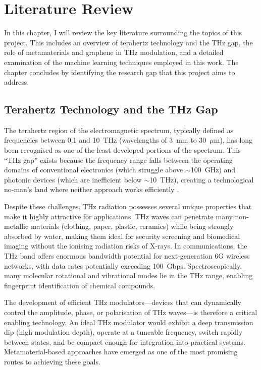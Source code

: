 \documentclass[12pt,a4paper]{report}
\begin{document}
\chapter{Literature Review}
\label{ch:literature}

In this chapter, I will review the key literature surrounding the topics of this project. This includes an overview of terahertz technology and the THz gap, the role of metamaterials and graphene in THz modulation, and a detailed examination of the machine learning techniques employed in this work. The chapter concludes by identifying the research gap that this project aims to address.

\section{Terahertz Technology and the THz Gap}
\label{sec:thz_gap}

The terahertz region of the electromagnetic spectrum, typically defined as frequencies between 0.1 and 10~THz (wavelengths of 3~mm to 30~$\mu$m), has long been recognised as one of the least developed portions of the spectrum. This ``THz gap'' exists because the frequency range falls between the operating domains of conventional electronics (which struggle above $\sim$100~GHz) and photonic devices (which are inefficient below $\sim$10~THz), creating a technological no-man's land where neither approach works efficiently \citep{tonouchi2007}.

Despite these challenges, THz radiation possesses several unique properties that make it highly attractive for applications. THz waves can penetrate many non-metallic materials (clothing, paper, plastic, ceramics) while being strongly absorbed by water, making them ideal for security screening and biomedical imaging without the ionising radiation risks of X-rays. In communications, the THz band offers enormous bandwidth potential for next-generation 6G wireless networks, with data rates potentially exceeding 100~Gbps. Spectroscopically, many molecular rotational and vibrational modes lie in the THz range, enabling fingerprint identification of chemical compounds.

The development of efficient THz modulators---devices that can dynamically control the amplitude, phase, or polarisation of THz waves---is therefore a critical enabling technology. An ideal THz modulator would exhibit a deep transmission dip (high modulation depth), operate at a tuneable frequency, switch rapidly between states, and be compact enough for integration into practical systems. Metamaterial-based approaches have emerged as one of the most promising routes to achieving these goals.
\end{document}
